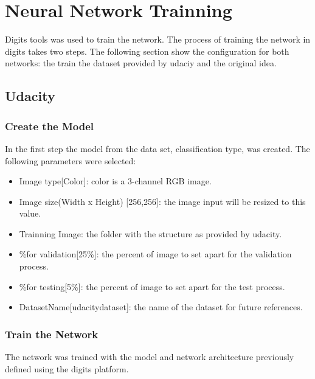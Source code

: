 \documentclass[10pt,journal,compsoc]{IEEEtran}
\begin{document}
\section{Neural Network Trainning}

Digits tools was used to train the network. The process of training the network in digits takes two steps. The following section show the configuration for both networks: the train the dataset provided by udaciy and the original idea.

\subsection{Udacity}
\subsubsection{Create the Model}

In the first step the model from the data set, classification type, was created. The following parameters were selected:

\begin{itemize}
\item Image type[Color]: color is a  3-channel RGB image.
\item Image size(Width x Height) [256,256]: the image input will be resized to this value. 
\item Trainning Image: the folder with the structure as provided by udacity.
\item \%for validation[25\%]: the percent of image to set apart for the validation process.
\item \%for testing[5\%]: the percent of image to set apart for the test process.
\item DatasetName[udacity\-dataset]: the name of the dataset for future references.
\end{itemize}

\subsubsection{Train the Network}

The network was trained with the model and network architecture previously defined using the digits platform.
\end{document}
